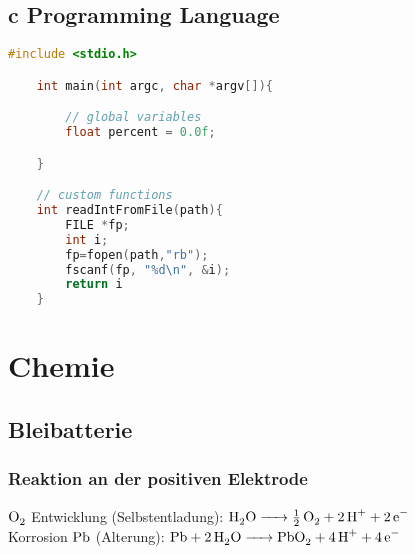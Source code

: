 \documentclass[english]{latex4ei/latex4ei_sheet}
\begin{document}
\begin{sectionbox}
	\subsection{c Programming Language}
	\begin{lstlisting}[language=C, gobble=4]
	#include <stdio.h>

	int main(int argc, char *argv[]){

		// global variables
		float percent = 0.0f;

	}

	// custom functions
	int readIntFromFile(path){
		FILE *fp;
		int i;
		fp=fopen(path,"rb");
		fscanf(fp, "%d\n", &i);
		return i
	}
	\end{lstlisting}
\end{sectionbox}


\section{Chemie}

\begin{sectionbox}

	\subsection{Bleibatterie}

		\subsubsection{Reaktion an der positiven Elektrode}
		\begin{center}
		\end{center}
		$\ce{O2}$ Entwicklung (Selbstentladung): $\ce{H2O -> 1/2O2 + 2H+ +2e-}$\\
		Korrosion $\ce{Pb}$ (Alterung): $\ce{Pb + 2H2O -> PbO2 + 4H+ +4e-}$
\end{sectionbox}


\end{document}
